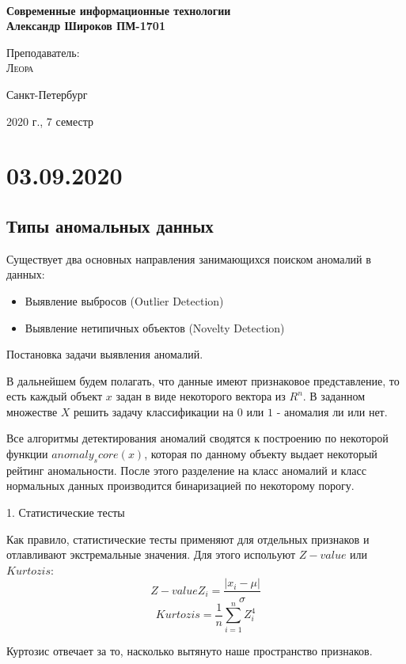 \documentclass[aps,%
12pt,%
final,%
oneside,
onecolumn,%
musixtex, %
superscriptaddress,%
centertags]{article} %
\theoremstyle{plain}
\theoremstyle{definition}
\theoremstyle{remark}
\begin{document}
\begin{titlepage} 
\begin{center}
\textbf{}\\[10.0cm]
\textbf{\LARGE Современные информационные технологии}\\[0.5cm]
\textbf{\Large Александр Широков ПМ-1701} \\[0.2cm]


\begin{center} \large
{Преподаватель:} \\[0.5cm]
\textsc {Леора}\\
\end{center}

\vfill 



{\large {Санкт-Петербург}} \par
{\large {2020 г., 7 семестр}}
\end{center} 
\end{titlepage}

\begin{thebibliography}{3}
\end{thebibliography}
\tableofcontents
\newpage

\section{03.09.2020}

\subsection{Типы аномальных данных}

Существует два основных направления занимающихся поиском аномалий в данных:
\begin{itemize}
	\item Выявление выбросов (Outlier Detection)
	\item Выявление нетипичных объектов (Novelty Detection)
\end{itemize}

Постановка задачи выявления аномалий.

В дальнейшем будем полагать, что данные имеют признаковое представление, то есть каждый объект $x$ задан в виде некоторого вектора из $R^n$. В заданном множестве $X$ решить задачу классификации на $0$ или $1$ - аномалия ли или нет.

Все алгоритмы детектирования аномалий сводятся к построению по некоторой функции $anomaly_score(x)$, которая по данному объекту выдает некоторый рейтинг аномальности. После этого разделение на класс аномалий и класс нормальных данных производится бинаризацией по некоторому порогу.

1. Статистические тесты

Как правило, статистические тесты применяют для отдельных признаков и отлавливают экстремальные значения. Для этого испольуют $Z-value$ или $Kurtozis$:
$$Z-value Z_i = \frac{|x_i-\mu|}{\sigma}$$
$$Kurtozis = \frac{1}{n}\sum\limits_{i=1}^n Z_i^4$$

Куртозис отвечает за то, насколько вытянуто наше пространство признаков.
\end{document}
